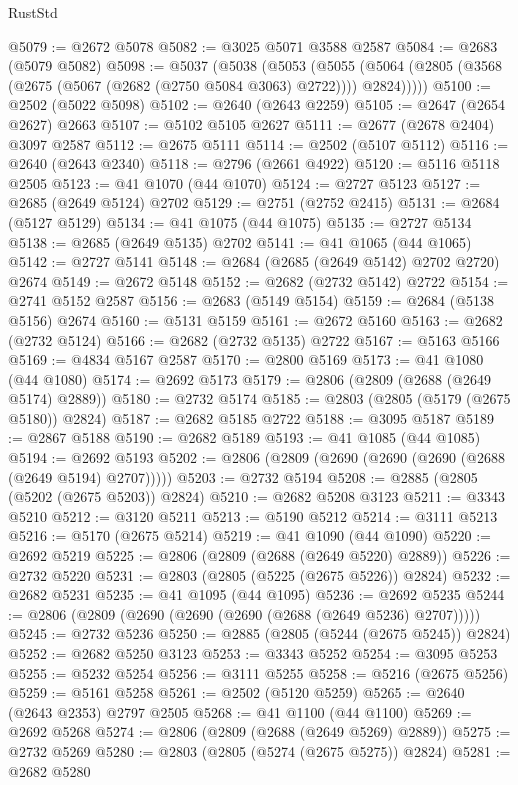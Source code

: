 \begin{lexlean}{RustStd}
\begin{coremodule}
{\begin{coremodule}
{{{{{{{{{{{{{{{{{{{{{{{{{{@5079 := @2672 @5078
@5082 := @3025 @5071 @3588 @2587
@5084 := @2683 (@5079 @5082)
@5098 := @5037
    (@5038
      (@5053
        (@5055 (@5064 (@2805 (@3568 (@2675 (@5067 (@2682 (@2750 @5084 @3063) @2722)))) @2824)))))
@5100 := @2502 (@5022 @5098)
@5102 := @2640 (@2643 @2259)
@5105 := @2647 (@2654 @2627) @2663
@5107 := @5102 @5105 @2627
@5111 := @2677 (@2678 @2404) @3097 @2587
@5112 := @2675 @5111
@5114 := @2502 (@5107 @5112)
@5116 := @2640 (@2643 @2340)
@5118 := @2796 (@2661 @4922)
@5120 := @5116 @5118 @2505
@5123 := @41 @1070 (@44 @1070)
@5124 := @2727 @5123
@5127 := @2685 (@2649 @5124) @2702
@5129 := @2751 (@2752 @2415)
@5131 := @2684 (@5127 @5129)
@5134 := @41 @1075 (@44 @1075)
@5135 := @2727 @5134
@5138 := @2685 (@2649 @5135) @2702
@5141 := @41 @1065 (@44 @1065)
@5142 := @2727 @5141
@5148 := @2684 (@2685 (@2649 @5142) @2702 @2720) @2674
@5149 := @2672 @5148
@5152 := @2682 (@2732 @5142) @2722
@5154 := @2741 @5152 @2587
@5156 := @2683 (@5149 @5154)
@5159 := @2684 (@5138 @5156) @2674
@5160 := @5131 @5159
@5161 := @2672 @5160
@5163 := @2682 (@2732 @5124)
@5166 := @2682 (@2732 @5135) @2722
@5167 := @5163 @5166
@5169 := @4834 @5167 @2587
@5170 := @2800 @5169
@5173 := @41 @1080 (@44 @1080)
@5174 := @2692 @5173
@5179 := @2806 (@2809 (@2688 (@2649 @5174) @2889))
@5180 := @2732 @5174
@5185 := @2803 (@2805 (@5179 (@2675 @5180)) @2824)
@5187 := @2682 @5185 @2722
@5188 := @3095 @5187
@5189 := @2867 @5188
@5190 := @2682 @5189
@5193 := @41 @1085 (@44 @1085)
@5194 := @2692 @5193
@5202 := @2806 (@2809 (@2690 (@2690 (@2690 (@2688 (@2649 @5194) @2707)))))
@5203 := @2732 @5194
@5208 := @2885 (@2805 (@5202 (@2675 @5203)) @2824)
@5210 := @2682 @5208 @3123
@5211 := @3343 @5210
@5212 := @3120 @5211
@5213 := @5190 @5212
@5214 := @3111 @5213
@5216 := @5170 (@2675 @5214)
@5219 := @41 @1090 (@44 @1090)
@5220 := @2692 @5219
@5225 := @2806 (@2809 (@2688 (@2649 @5220) @2889))
@5226 := @2732 @5220
@5231 := @2803 (@2805 (@5225 (@2675 @5226)) @2824)
@5232 := @2682 @5231
@5235 := @41 @1095 (@44 @1095)
@5236 := @2692 @5235
@5244 := @2806 (@2809 (@2690 (@2690 (@2690 (@2688 (@2649 @5236) @2707)))))
@5245 := @2732 @5236
@5250 := @2885 (@2805 (@5244 (@2675 @5245)) @2824)
@5252 := @2682 @5250 @3123
@5253 := @3343 @5252
@5254 := @3095 @5253
@5255 := @5232 @5254
@5256 := @3111 @5255
@5258 := @5216 (@2675 @5256)
@5259 := @5161 @5258
@5261 := @2502 (@5120 @5259)
@5265 := @2640 (@2643 @2353) @2797 @2505
@5268 := @41 @1100 (@44 @1100)
@5269 := @2692 @5268
@5274 := @2806 (@2809 (@2688 (@2649 @5269) @2889))
@5275 := @2732 @5269
@5280 := @2803 (@2805 (@5274 (@2675 @5275)) @2824)
@5281 := @2682 @5280
}}}}}}}}}}}}}}}}}}}}}}}}}}
\end{coremodule}}
\end{coremodule}
\end{lexlean}
